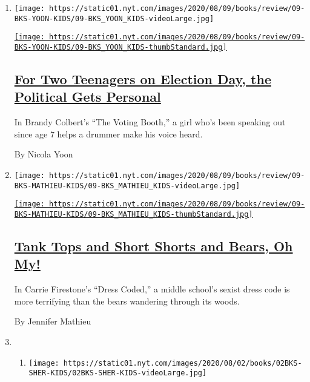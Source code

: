 \begin{enumerate}
\def\labelenumi{\arabic{enumi}.}
\item
  \texttt{[image: https://static01.nyt.com/images/2020/08/09/books/review/09-BKS-YOON-KIDS/09-BKS\_YOON\_KIDS-videoLarge.jpg]}

  \href{/2020/08/01/books/review/brandy-colbert-the-voting-booth.html}{\texttt{[image: https://static01.nyt.com/images/2020/08/09/books/review/09-BKS-YOON-KIDS/09-BKS\_YOON\_KIDS-thumbStandard.jpg]}}

  \hypertarget{for-two-teenagers-on-election-day-the-political-gets-personal}{%
  \subsection{\texorpdfstring{\href{/2020/08/01/books/review/brandy-colbert-the-voting-booth.html}{For
  Two Teenagers on Election Day, the Political Gets
  Personal}}{For Two Teenagers on Election Day, the Political Gets Personal}}\label{for-two-teenagers-on-election-day-the-political-gets-personal}}

  In Brandy Colbert's ``The Voting Booth,'' a girl who's been speaking
  out since age 7 helps a drummer make his voice heard.

  By Nicola Yoon
\item
  \texttt{[image: https://static01.nyt.com/images/2020/08/09/books/review/09-BKS-MATHIEU-KIDS/09-BKS\_MATHIEU\_KIDS-videoLarge.jpg]}

  \href{/2020/08/01/books/review/carrie-firestone-dress-coded.html}{\texttt{[image: https://static01.nyt.com/images/2020/08/09/books/review/09-BKS-MATHIEU-KIDS/09-BKS\_MATHIEU\_KIDS-thumbStandard.jpg]}}

  \hypertarget{tank-tops-and-short-shorts-and-bears-oh-my}{%
  \subsection{\texorpdfstring{\href{/2020/08/01/books/review/carrie-firestone-dress-coded.html}{Tank
  Tops and Short Shorts and Bears, Oh
  My!}}{Tank Tops and Short Shorts and Bears, Oh My!}}\label{tank-tops-and-short-shorts-and-bears-oh-my}}

  In Carrie Firestone's ``Dress Coded,'' a middle school's sexist dress
  code is more terrifying than the bears wandering through its woods.

  By Jennifer Mathieu
\item
  \begin{enumerate}
  \def\labelenumii{\arabic{enumii}.}
  \item
    \texttt{[image: https://static01.nyt.com/images/2020/08/02/books/02BKS-SHER-KIDS/02BKS-SHER-KIDS-videoLarge.jpg]}


\end{enumerate}
\end{enumerate}
